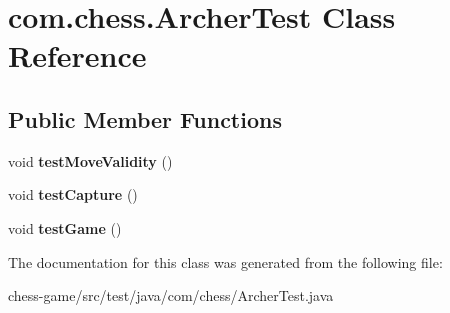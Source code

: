\hypertarget{classcom_1_1chess_1_1_archer_test}{}\section{com.\+chess.\+Archer\+Test Class Reference}
\label{classcom_1_1chess_1_1_archer_test}
\subsection*{Public Member Functions}
\begin{DoxyCompactItemize}
\item 
\mbox{\label{classcom_1_1chess_1_1_archer_test_a65f30f1f8f70a30b1372eb26b51f09e7}} 
void {\bfseries test\+Move\+Validity} ()
\item 
\mbox{\label{classcom_1_1chess_1_1_archer_test_aaebba9381093f4b3a8423323a47e269b}} 
void {\bfseries test\+Capture} ()
\item 
\mbox{\label{classcom_1_1chess_1_1_archer_test_a12fbbe2d55ae00b0ce94bbe208fd61c6}} 
void {\bfseries test\+Game} ()
\end{DoxyCompactItemize}


The documentation for this class was generated from the following file\+:\begin{DoxyCompactItemize}
\item 
chess-\/game/src/test/java/com/chess/Archer\+Test.\+java\end{DoxyCompactItemize}
